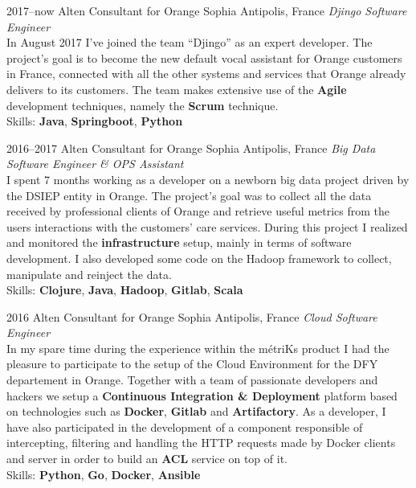 \documentclass[]{friggeri-cv}
\begin{document}
\begin{entrylist}
  \entry
    {2017--now}
    {Alten Consultant for Orange}
    {Sophia Antipolis, France}
    {\emph{Djingo Software Engineer} \\
      In August 2017 I've joined the team ``Djingo'' as an expert developer.
      The project's goal is to become the new default vocal assistant for
      Orange customers in France, connected with all the other systems and
      services that Orange already delivers to its customers.  The team makes
      extensive use of the \textbf{Agile} development techniques, namely the
      \textbf{Scrum} technique. \\
      Skills: \textbf{Java}, \textbf{Springboot}, \textbf{Python}
    }
\end{entrylist}

\begin{entrylist}
  \entry
    {2016--2017}
    {Alten Consultant for Orange}
    {Sophia Antipolis, France}
    {\emph{Big Data Software Engineer \& OPS Assistant} \\
      I spent 7 months working as a developer on a newborn big data project driven by
      the DSIEP entity in Orange.  The project's goal was to collect all the
      data received by professional clients of Orange and retrieve useful metrics
      from the users interactions with the customers' care services.  During this
      project I realized and monitored the \textbf{infrastructure} setup, mainly in 
      terms of software development.  I also developed some code on the Hadoop 
      framework to collect, manipulate and reinject the data. \\
      Skills: \textbf{Clojure}, \textbf{Java}, \textbf{Hadoop}, \textbf{Gitlab},
      \textbf{Scala}
    }
\end{entrylist}


\begin{entrylist}
  \entry
    {2016}
    {Alten Consultant for Orange}
    {Sophia Antipolis, France}
    {\emph{Cloud Software Engineer} \\
      In my spare time during the experience within the métriKs product I had
      the pleasure to participate to the setup of the Cloud Environment for the
      DFY departement in Orange.  Together with a team of passionate developers
      and hackers we setup a \textbf{Continuous Integration \& Deployment}
      platform based on technologies such as \textbf{Docker}, \textbf{Gitlab} and
      \textbf{Artifactory}.  As a developer, I have also participated in the
      development of a component responsible of intercepting, filtering and handling
      the HTTP requests made by Docker clients and server in order to build an
      \textbf{ACL} service on top of it. \\
      Skills: \textbf{Python}, \textbf{Go}, \textbf{Docker}, \textbf{Ansible}
    }
\end{entrylist}
\end{document}
